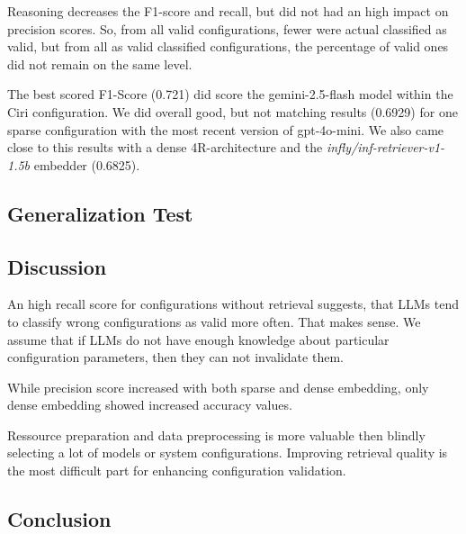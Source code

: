 Reasoning decreases the F1-score and recall, but did not had an high impact on precision scores. So, from all valid configurations, fewer were actual classified as valid, but from all as valid classified configurations, the percentage of valid ones did not remain on the same level.

The best scored F1-Score (0.721) did score the gemini-2.5-flash model within the Ciri configuration. We did overall good, but not matching results (0.6929) for one sparse configuration with the most recent version of gpt-4o-mini. We also came close to this results with a dense 4R-architecture and the \textit{infly/inf-retriever-v1-1.5b} embedder (0.6825). 



\subsection{Generalization Test} \label{sec:exp_generalization}

\subsection{Discussion} \label{sec:exp_discussion}

An high recall score for configurations without retrieval suggests, that LLMs tend to classify wrong configurations as valid more often. That makes sense. We assume that if LLMs do not have enough knowledge about particular configuration parameters, then they can not invalidate them. 

While precision score increased with both sparse and dense embedding, only dense embedding showed increased accuracy values.

Ressource preparation and data preprocessing is more valuable then blindly selecting a lot of models or system configurations. Improving retrieval quality is the most difficult part for enhancing configuration validation. 

\subsection{Conclusion} \label{sec:exp_conclusion}
